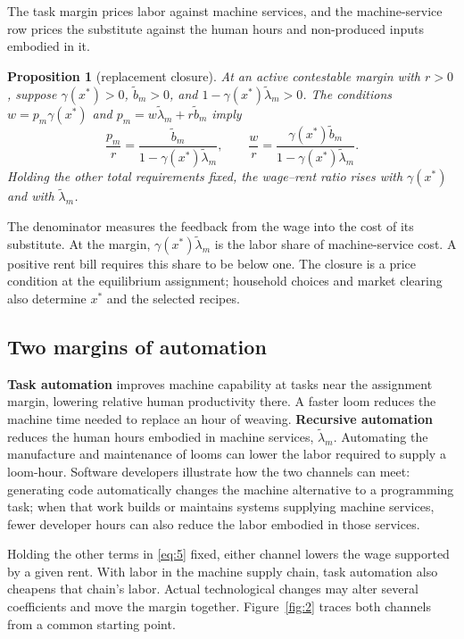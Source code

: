 \documentclass[12pt]{article}
\theoremstyle{plain}
\newtheorem{proposition}{Proposition}
\begin{document}
The task margin prices labor against machine services, and the machine-service row prices the substitute against the human hours and non-produced inputs embodied in it.

\begin{proposition}[replacement closure]\label{prop:2}
At an active contestable margin with $r>0$, suppose $\gamma(x^*)>0$, $\widetilde{b}_m>0$, and $1-\gamma(x^*)\widetilde{\lambda}_m>0$. The conditions $w=p_m\gamma(x^*)$ and $p_m=w\widetilde{\lambda}_m+r\widetilde{b}_m$ imply
\begin{equation}\label{eq:5}
\frac{p_m}{r}
=
\frac{\widetilde{b}_m}{1-\gamma(x^*)\widetilde{\lambda}_m},
\qquad
\frac{w}{r}
=
\frac{\gamma(x^*)\widetilde{b}_m}{1-\gamma(x^*)\widetilde{\lambda}_m}.
\end{equation}
Holding the other total requirements fixed, the wage--rent ratio rises with $\gamma(x^*)$ and with $\widetilde{\lambda}_m$.
\end{proposition}

The denominator measures the feedback from the wage into the cost of its substitute. At the margin, $\gamma(x^*)\widetilde{\lambda}_m$ is the labor share of machine-service cost. A positive rent bill requires this share to be below one. The closure is a price condition at the equilibrium assignment; household choices and market clearing also determine $x^*$ and the selected recipes.

\subsection{Two margins of automation}\label{sec:3.4}

\textbf{Task automation} improves machine capability at tasks near the assignment margin, lowering relative human productivity there. A faster loom reduces the machine time needed to replace an hour of weaving. \textbf{Recursive automation} reduces the human hours embodied in machine services, $\widetilde{\lambda}_m$. Automating the manufacture and maintenance of looms can lower the labor required to supply a loom-hour. Software developers illustrate how the two channels can meet: generating code automatically changes the machine alternative to a programming task; when that work builds or maintains systems supplying machine services, fewer developer hours can also reduce the labor embodied in those services.

Holding the other terms in \eqref{eq:5} fixed, either channel lowers the wage supported by a given rent. With labor in the machine supply chain, task automation also cheapens that chain's labor. Actual technological changes may alter several coefficients and move the margin together. Figure~\ref{fig:2} traces both channels from a common starting point.
\end{document}
